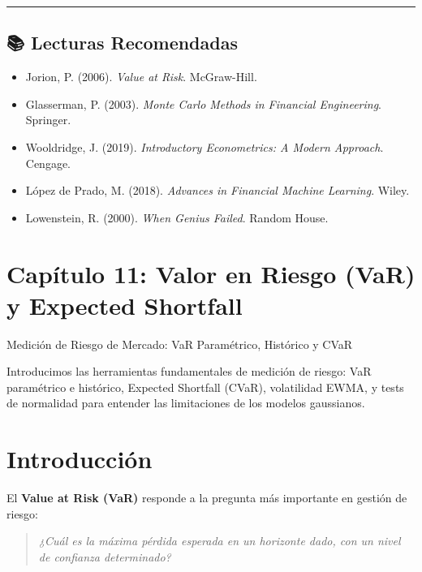 \documentclass[
  spanish,
  letterpaper,
  DIV=11,
  numbers=noendperiod]{scrreprt}
\providecommand{\tightlist}{%
  \setlength{\itemsep}{0pt}\setlength{\parskip}{0pt}}
\begin{document}
\begin{center}\rule{0.5\linewidth}{0.5pt}\end{center}

\section*{📚 Lecturas Recomendadas}\label{lecturas-recomendadas-2}


\begin{itemize}
\tightlist
\item
  Jorion, P. (2006). \emph{Value at Risk}. McGraw-Hill.
\item
  Glasserman, P. (2003). \emph{Monte Carlo Methods in Financial
  Engineering}. Springer.
\item
  Wooldridge, J. (2019). \emph{Introductory Econometrics: A Modern
  Approach}. Cengage.
\item
  López de Prado, M. (2018). \emph{Advances in Financial Machine
  Learning}. Wiley.
\item
  Lowenstein, R. (2000). \emph{When Genius Failed}. Random House.
\end{itemize}

\chapter{Capítulo 11: Valor en Riesgo (VaR) y Expected
Shortfall}\label{capuxedtulo-11-valor-en-riesgo-var-y-expected-shortfall}

Medición de Riesgo de Mercado: VaR Paramétrico, Histórico y CVaR

Introducimos las herramientas fundamentales de medición de riesgo: VaR
paramétrico e histórico, Expected Shortfall (CVaR), volatilidad EWMA, y
tests de normalidad para entender las limitaciones de los modelos
gaussianos.

\hfill\break

\chapter{Introducción}\label{introducciuxf3n-8}

El \textbf{Value at Risk (VaR)} responde a la pregunta más importante en
gestión de riesgo:

\begin{quote}
\emph{¿Cuál es la máxima pérdida esperada en un horizonte dado, con un
nivel de confianza determinado?}
\end{quote}
\end{document}
